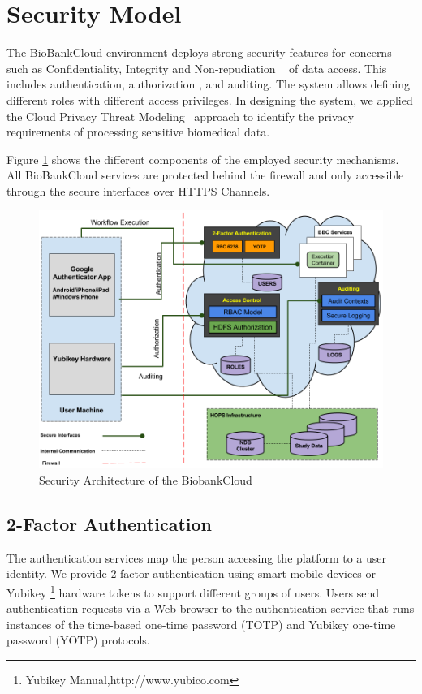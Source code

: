 \section{Security Model}

The BioBankCloud environment deploys strong security features for concerns such as Confidentiality, Integrity and Non-repudiation ~\cite{BBCSEC} of data access. This includes authentication, authorization
, and auditing. The system allows defining different roles with different access privileges. In designing the system, we applied the Cloud Privacy Threat Modeling~\cite {CPTM} approach to identify the privacy requirements of processing sensitive biomedical data.


Figure \ref{fig:security} shows the different components of the employed security mechanisms. All BioBankCloud services are protected behind the firewall and only accessible through the secure interfaces over HTTPS Channels.


\begin{figure}[h]
\centering
\includegraphics[width=\textwidth]{./imgs/security.png}
\caption{Security Architecture of the BiobankCloud}
\label{fig:security}
\end{figure}


\subsection{2-Factor Authentication}
The authentication services map the person accessing the platform to a user identity. We provide 2-factor authentication using smart mobile devices or Yubikey \footnote {Yubikey Manual,http://www.yubico.com} hardware tokens to support different groups of users. Users send authentication requests via a Web browser to the authentication service that runs instances of the time-based one-time password (TOTP) and Yubikey one-time password (YOTP) protocols.

